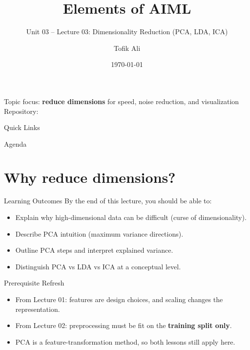 \documentclass[aspectratio=169]{beamer}
\title[Elements of AIML]{Elements of AIML}
\subtitle{Unit 03 -- Lecture 03: Dimensionality Reduction (PCA, LDA, ICA)}
\author{Tofik Ali}
\institute{School of Computer Science, UPES Dehradun}
\date{\today}
\begin{document}
\UPESCoverFrame
\setcounter{framenumber}{0}

\begin{frame}
  \titlepage
  \vspace{0.3em}
  \begin{center}
    \footnotesize Topic focus: \textbf{reduce dimensions} for speed, noise reduction, and visualization\\[0.25em]
    \footnotesize Repository: \texttt{\AIMLRepoURL}
  \end{center}
  \slidesources{\AIMLUnitIIISources}
\end{frame}

\begin{frame}{Quick Links}
  \centering
  \hyperlink{sec:why}{}\hspace{0.6em}
  \hyperlink{sec:pca}{}\hspace{0.6em}
  \hyperlink{sec:ldaica}{}\hspace{0.6em}
  \hyperlink{sec:example}{}\hspace{0.6em}
  \hyperlink{sec:summary}{}
\end{frame}

\begin{frame}{Agenda}
  \tableofcontents
\end{frame}

\section{Why reduce dimensions?}
\label{sec:why}

\begin{frame}{Learning Outcomes}
  By the end of this lecture, you should be able to:
  \begin{itemize}[<+->]
    \item Explain why high-dimensional data can be difficult (curse of dimensionality).
    \item Describe PCA intuition (maximum variance directions).
    \item Outline PCA steps and interpret explained variance.
    \item Distinguish PCA vs LDA vs ICA at a conceptual level.
  \end{itemize}
\end{frame}

\begin{frame}{Prerequisite Refresh}
  \begin{itemize}[<+->]
    \item From Lecture 01: features are design choices, and scaling changes the representation.
    \item From Lecture 02: preprocessing must be fit on the \textbf{training split only}.
    \item PCA is a feature-transformation method, so both lessons still apply here.
  \end{itemize}
\end{frame}
\end{document}

